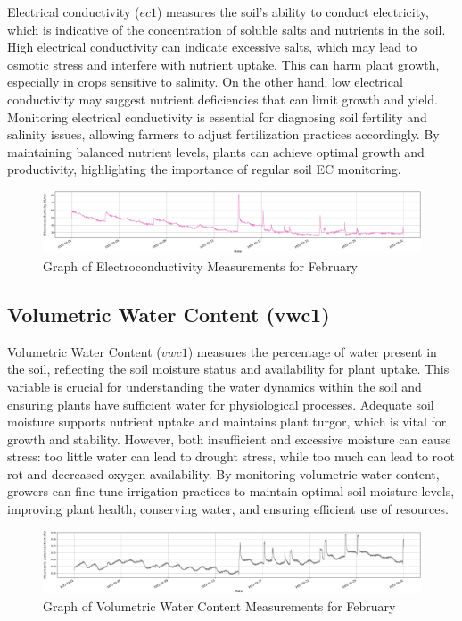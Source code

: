 Electrical conductivity (\( ec1 \)) measures the soil's ability to conduct electricity, which is indicative of the concentration of soluble salts and nutrients in the soil. High electrical conductivity can indicate excessive salts, which may lead to osmotic stress and interfere with nutrient uptake. This can harm plant growth, especially in crops sensitive to salinity. On the other hand, low electrical conductivity may suggest nutrient deficiencies that can limit growth and yield. Monitoring electrical conductivity is essential for diagnosing soil fertility and salinity issues, allowing farmers to adjust fertilization practices accordingly. By maintaining balanced nutrient levels, plants can achieve optimal growth and productivity, highlighting the importance of regular soil EC monitoring.

\begin{figure}[htbp]
    \centering
    \includegraphics[width=15 cm]{4_ChapterMaterials/figuras/train_data_Electroconductivity.pdf}
    \caption{Graph of Electroconductivity Measurements for February}
    \end{figure}

\subsection{Volumetric Water Content (vwc1)}

Volumetric Water Content (\( vwc1 \)) measures the percentage of water present in the soil, reflecting the soil moisture status and availability for plant uptake. This variable is crucial for understanding the water dynamics within the soil and ensuring plants have sufficient water for physiological processes. Adequate soil moisture supports nutrient uptake and maintains plant turgor, which is vital for growth and stability. However, both insufficient and excessive moisture can cause stress: too little water can lead to drought stress, while too much can lead to root rot and decreased oxygen availability. By monitoring volumetric water content, growers can fine-tune irrigation practices to maintain optimal soil moisture levels, improving plant health, conserving water, and ensuring efficient use of resources.

\begin{figure}[htbp]
    \centering
    \includegraphics[width=15 cm]{4_ChapterMaterials/figuras/train_data_Volumetric_water_content.pdf}
    \caption{Graph of Volumetric Water Content Measurements for February}
    \end{figure}

